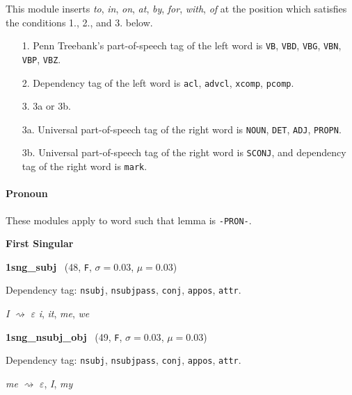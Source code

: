 \documentclass[11pt]{article}
\newenvironment{desc}{%
	\list{}{%
		\parsep 0.25em
		\topsep 0.25em
		\leftmargin 1em
		\rightmargin 0em
	}
	\item\relax
	\sloppy
}{%
	\endlist
}
\newcommand{\attr}[4]{%
	(#1, \texttt{#2}, $\sigma=#3$, $\mu=#4$)
}
\begin{document}
\begin{desc}
	This module inserts
	\textit{to},
	\textit{in},
	\textit{on},
	\textit{at},
	\textit{by},
	\textit{for},
	\textit{with},
	\textit{of}
	at the position which satisfies the conditions 1., 2., and 3. below.

	\begin{itemize}
		\setlength{\itemsep}{0em}
		\setlength{\parskip}{0em}
		\item[1.] Penn Treebank's part-of-speech tag of the left word is
			\texttt{VB},
			\texttt{VBD},
			\texttt{VBG},
			\texttt{VBN},
			\texttt{VBP},
			\texttt{VBZ}.
		\item[2.] Dependency tag of the left word is
			\texttt{acl},
			\texttt{advcl},
			\texttt{xcomp},
			\texttt{pcomp}.
		\item[3.] 3a or 3b.
		\item[3a.] Universal part-of-speech tag of the right word is
			\texttt{NOUN},
			\texttt{DET},
			\texttt{ADJ},
			\texttt{PROPN}.
		\item[3b.] Universal part-of-speech tag of the right word is \texttt{SCONJ},
			and dependency tag of the right word is \texttt{mark}.
	\end{itemize}
\end{desc}

\paragraph{Pronoun}\mbox{}

These modules apply to word such that lemma is \texttt{-PRON-}.

\noindent
\textbf{First Singular}

\noindent
\textbf{1sng\_subj}~\attr{48}{F}{0.03}{0.03}

\begin{desc}
	Dependency tag:
	\texttt{nsubj},
	\texttt{nsubjpass},
	\texttt{conj},
	\texttt{appos},
	\texttt{attr}.

	\textit{I}
	$\rightsquigarrow$
	\textit{$\varepsilon$}
	\textit{i},
	\textit{it},
	\textit{me},
	\textit{we}
\end{desc}

\noindent
\textbf{1sng\_nsubj\_obj}~\attr{49}{F}{0.03}{0.03}

\begin{desc}
	Dependency tag:
	\texttt{nsubj},
	\texttt{nsubjpass},
	\texttt{conj},
	\texttt{appos},
	\texttt{attr}.

	\textit{me}
	$\rightsquigarrow$
	\textit{$\varepsilon$},
	\textit{I},
	\textit{my}
\end{desc}
\end{document}
